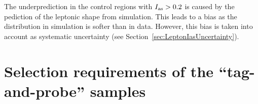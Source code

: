\newpage 
The underprediction in the control regions with $I_{\text{as}}>0.2$ is caused by the pediction of the leptonic \ias shape from simulation.
This leads to a bias as the \ias distribution in simulation is softer than in data.
However, this bias is taken into account as systematic uncertainty (see Section~\ref{sec:LeptonIasUncertainty}).


\clearpage
\chapter{Selection requirements of the ``tag-and-probe'' samples}
\label{app:TagAndProbeRequirements}

